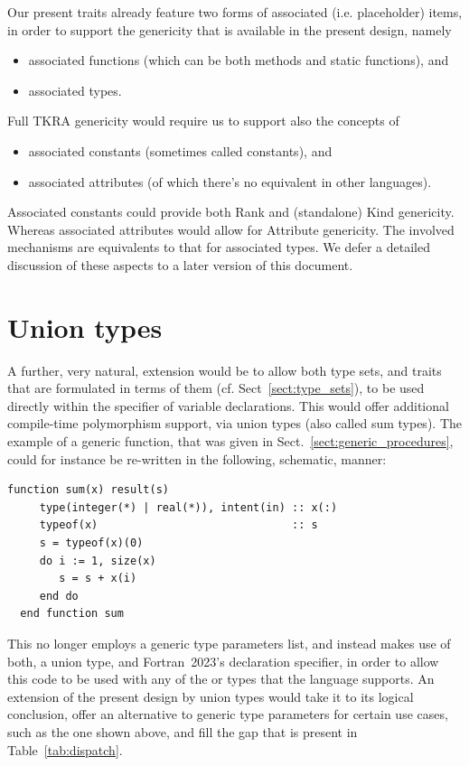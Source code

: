 \documentclass[11pt,oneside]{report}
\newcommand{\code}[1]{{\selectfont\ttfamily{#1}}}
\begin{document}
Our present traits already feature two forms of associated
(i.e. placeholder) items, in order to support the genericity that is
available in the present design, namely
\begin{itemize}
\item
  associated functions (which can be both methods and static functions), and
\item
  associated types.
\end{itemize}
Full TKRA genericity would require us to support also the concepts of
\begin{itemize}
\item
  associated constants (sometimes called \code{static} constants), and
\item
  associated attributes (of which there’s no equivalent in other languages).
\end{itemize}
Associated constants could provide both Rank and (standalone) Kind
genericity. Whereas associated attributes would allow for Attribute
genericity. The involved mechanisms are equivalents to that for
associated types. We defer a detailed discussion of these aspects to a
later version of this document.

\section{Union types}
\label{sect:union_types}

A further, very natural, extension would be to allow both type sets,
and traits that are formulated in terms of them
(cf. Sect~\ref{sect:type_sets}), to be used directly within the
\code{type} specifier of variable declarations. This would offer
additional compile-time polymorphism support, via union types (also
called sum types). The example of a generic \code{sum} function, that
was given in Sect.~\ref{sect:generic_procedures}, could for instance
be re-written in the following, schematic, manner:
\begin{lstlisting}[language=LFortran,style=boxed]
  function sum(x) result(s)
     type(integer(*) | real(*)), intent(in) :: x(:)
     typeof(x)                              :: s
     s = typeof(x)(0)
     do i := 1, size(x)
        s = s + x(i)
     end do
  end function sum
\end{lstlisting}

This no longer employs a generic type parameters list, and instead
makes use of both, a union type, and Fortran~2023's \code{typeof}
declaration specifier, in order to allow this code to be used
with any of the \code{integer} or \code{real} types that the language
supports. An extension of the present design by union types would take
it to its logical conclusion, offer an alternative to generic type
parameters for certain use cases, such as the one shown above, and fill
the gap that is present in Table~\ref{tab:dispatch}.
\end{document}

